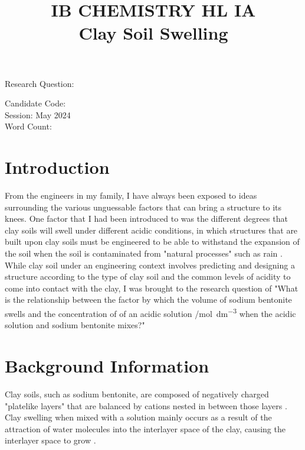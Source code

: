 \documentclass[11pt, letterpaper]{article}
\title{IB CHEMISTRY HL IA
\\
Clay Soil Swelling}
\author{}
\date{}
\begin{document}
\nocite{*}

\maketitle

\begin{center}
    Research Question:
    \\
\end{center}

\begin{center}
    Candidate Code:
    \\
    Session: May 2024
    \\
    Word Count:
\end{center}
\newpage

\tableofcontents
\newpage


\section{Introduction}

\setcounter{page}{1}

From the engineers in my family, I have always been exposed to ideas
surrounding the various unguessable factors that can
bring a structure to its knees. One factor that I had been
introduced to was the different degrees that clay soils will swell under different acidic conditions,
in which structures that are built upon clay soils must
be engineered to be able to withstand the expansion of the soil
when the soil is contaminated from "natural processes" such
as rain \cite{ramavaraprasadSwellingCharacteristicsSoils2018a}.
While clay soil under an engineering context involves
predicting and designing a structure according to the
type of clay soil and the common levels of acidity
to come into contact with the clay, I was brought to the
research question of "What is the relationship between
the factor by which the volume of
sodium bentonite swells and the concentration of  of an acidic solution /\unit{mol.dm^{-3}} when the acidic solution and sodium bentonite
mixes?"


\section{Background Information}

Clay soils, such as sodium bentonite, are composed of negatively charged
"platelike layers" that are balanced by cations nested in between
those layers \cite{chenClaySwellingRole2022}. Clay swelling when mixed with a solution mainly occurs
as a result of the attraction of water molecules into the interlayer space
of the clay, causing the interlayer space to grow \cite{chenClaySwellingRole2022}.
\end{document}
